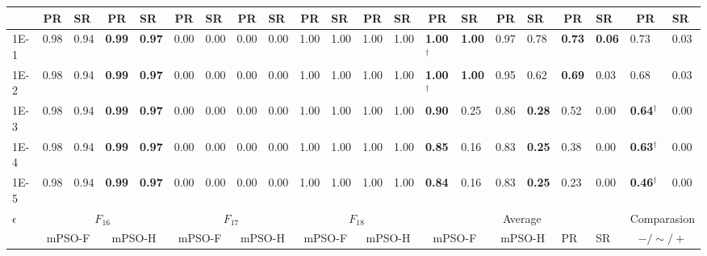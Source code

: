 \begin{table*}[h]
{\begin{tabular}{|p{4.8mm}|p{4.6mm}|p{4.6mm}|p{4.6mm}|p{4.6mm}|p{4.6mm}|p{4.6mm}|p{4.6mm}|p{4.6mm}|p{4.6mm}|p{4.6mm}|p{4.6mm}|p{4.6mm}|p{4.6mm}|p{4.6mm}|p{4.6mm}|p{4.6mm}|p{4.6mm}|p{4.6mm}|p{4.6mm}|p{4.6mm}|}
    \cline{2-21}
     & \multicolumn{1}{c|}{PR} & SR & \multicolumn{1}{c|}{PR} & SR & \multicolumn{1}{c|}{PR} & SR & \multicolumn{1}{c|}{PR} & SR & \multicolumn{1}{c|}{PR} & SR & \multicolumn{1}{c|}{PR} & SR & \multicolumn{1}{c|}{PR} & SR & \multicolumn{1}{c|}{PR} & SR & \multicolumn{1}{c|}{PR} & SR & \multicolumn{1}{c|}{PR} & SR \\
    \hline
    1E-1 & 0.98 & 0.94 & \textcolor{customblue}{\textbf{0.99}} & \textcolor{customblue}{\textbf{0.97}} & 0.00 & 0.00 & 0.00 & 0.00 & 1.00 & 1.00 & 1.00 & 1.00 & \textcolor{customred}{\textbf{1.00$^\dagger$}} & \textcolor{customred}{\textbf{1.00}} & 0.97 & 0.78 & \textcolor{customred}{\textbf{0.73}} & \textcolor{customred}{\textbf{0.06}} & 0.73 & 0.03 \\
    1E-2 & 0.98 & 0.94 & \textcolor{customblue}{\textbf{0.99}} & \textcolor{customblue}{\textbf{0.97}} & 0.00 & 0.00 & 0.00 & 0.00 & 1.00 & 1.00 & 1.00 & 1.00 & \textcolor{customred}{\textbf{1.00$^\dagger$}} & \textcolor{customred}{\textbf{1.00}} & 0.95 & 0.62 & \textcolor{customred}{\textbf{0.69}} & 0.03 & 0.68 & 0.03 \\
    1E-3 & 0.98 & 0.94 & \textcolor{customblue}{\textbf{0.99}} & \textcolor{customblue}{\textbf{0.97}} & 0.00 & 0.00 & 0.00 & 0.00 & 1.00 & 1.00 & 1.00 & 1.00 & \textcolor{customred}{\textbf{0.90}} & 0.25 & 0.86 & \textcolor{customblue}{\textbf{0.28}} & 0.52 & 0.00 & \textcolor{customblue}{\textbf{0.64$^\dagger$}} & 0.00 \\
    1E-4 & 0.98 & 0.94 & \textcolor{customblue}{\textbf{0.99}} & \textcolor{customblue}{\textbf{0.97}} & 0.00 & 0.00 & 0.00 & 0.00 & 1.00 & 1.00 & 1.00 & 1.00 & \textcolor{customred}{\textbf{0.85}} & 0.16 & 0.83 & \textcolor{customblue}{\textbf{0.25}} & 0.38 & 0.00 & \textcolor{customblue}{\textbf{0.63$^\dagger$}} & 0.00 \\
    1E-5 & 0.98 & 0.94 & \textcolor{customblue}{\textbf{0.99}} & \textcolor{customblue}{\textbf{0.97}} & 0.00 & 0.00 & 0.00 & 0.00 & 1.00 & 1.00 & 1.00 & 1.00 & \textcolor{customred}{\textbf{0.84}} & 0.16 & 0.83 & \textcolor{customblue}{\textbf{0.25}} & 0.23 & 0.00 & \textcolor{customblue}{\textbf{0.46$^\dagger$}} & 0.00 \\
    \hline
    \multirow{3}{*}{$\epsilon$} & \multicolumn{4}{c|}{$F_{16}$} & \multicolumn{4}{c|}{$F_{17}$} & \multicolumn{4}{c|}{$F_{18}$} & \multicolumn{6}{c|}{Average} & \multicolumn{2}{c|}{Comparasion} \\

    \cline{2-21}
    & \multicolumn{2}{c|}{mPSO-F} & \multicolumn{2}{c|}{mPSO-H} & \multicolumn{2}{c|}{mPSO-F} & \multicolumn{2}{c|}{mPSO-H} & \multicolumn{2}{c|}{mPSO-F} & \multicolumn{2}{c|}{mPSO-H} & \multicolumn{2}{c|}{mPSO-F} & \multicolumn{2}{c|}{mPSO-H} & PR & SR & \multicolumn{2}{c|}{$-/\sim/+$} \\


\end{tabular}}
\end{table*}
